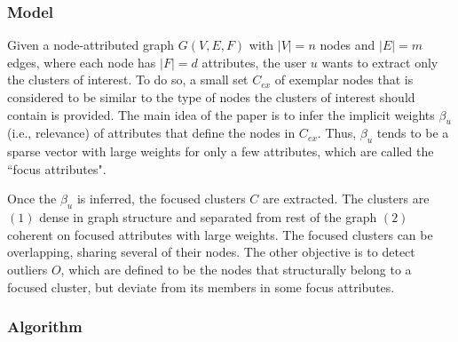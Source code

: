 \documentclass[11pt, oneside]{article}   	%
\begin{document}
\subsubsection*{Model}

\quad Given a node-attributed graph $G(V,E,F)$ with $|V|=n$ nodes and $|E|=m$ edges, where each node has $|F| = d$ attributes, the user $u$ wants to extract only the clusters of interest.
To do so, a small set $C_{ex}$ of exemplar nodes that is considered to be similar to the type of nodes the clusters of interest should contain is provided.
The main idea of the paper is to infer the implicit weights $\beta_{u}$ (i.e., relevance) of attributes that define the nodes in $C_{ex}$.
Thus, $\beta_u$ tends to be a sparse vector with large weights for only a few attributes, which are called the ``focus attributes".

\quad Once the $\beta_u$ is inferred, the focused clusters $C$ are extracted. 
The clusters are $(1)$ dense in graph structure and separated from rest of the graph $(2)$ coherent on focused attributes with large weights.
The focused clusters can be overlapping, sharing several of their nodes.
The other objective is to detect outliers $O$, which are defined to be the nodes that structurally belong to a focused cluster, but deviate from its members in some focus attributes.


\subsubsection*{Algorithm}
\end{document}
